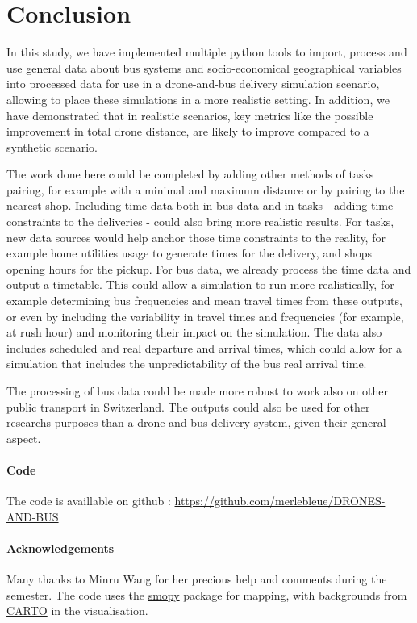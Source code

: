 \section{Conclusion}
\label{sec:conclusion}

In this study, we have implemented multiple python tools to import, process and use general data about bus systems and socio-economical geographical variables into processed data for use in a drone-and-bus delivery simulation scenario, allowing to place these simulations in a more realistic setting. In addition, we have demonstrated that in realistic scenarios, key metrics like the possible improvement in total drone distance, are likely to improve compared to a synthetic scenario.

The work done here could be completed by adding other methods of tasks pairing, for example with a minimal and maximum distance or by pairing to the nearest shop. Including time data both in bus data and in tasks - adding time constraints to the deliveries - could also bring more realistic results. For tasks, new data sources would help anchor those time constraints to the reality, for example home utilities usage to generate times for the delivery, and shops opening hours for the pickup. For bus data, we already process the time data and output a timetable. This could allow a simulation to run more realistically, for example determining bus frequencies and mean travel times from these outputs, or even by including the variability in travel times and frequencies (for example, at rush hour) and monitoring their impact on the simulation. The data also includes scheduled and real departure and arrival times, which could allow for a simulation that includes the unpredictability of the bus real arrival time.

The processing of bus data could be made more robust to work also on other public transport in Switzerland. The outputs could also be used for other researchs purposes than a drone-and-bus delivery system, given their general aspect.

\vspace{7cm}

\paragraph{Code} The code is availlable on github : \url{https://github.com/merlebleue/DRONES-AND-BUS}

\paragraph{Acknowledgements} Many thanks to Minru Wang for her precious help and comments during the semester. The code uses the \href{https://github.com/rossant/smopy}{smopy} package for mapping, with backgrounds from \href{https://carto.com/}{CARTO} in the visualisation.
